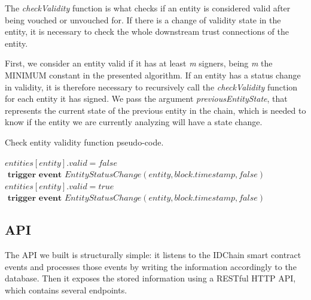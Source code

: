 The \textit{checkValidity} function is what checks if an entity is considered valid after being vouched or unvouched for.
If there is a change of validity state in the entity, it is necessary to check the whole downstream trust connections of the entity.

First, we consider an entity valid if it has at least \textit{m} signers, being \textit{m} the MINIMUM constant in the presented algorithm.
If an entity has a status change in validity, it is therefore necessary to recursively call the \textit{checkValidity} function for each entity it has signed.
We pass the argument \textit{previousEntityState}, that represents the current state of the previous entity in the chain, which is needed to know if the entity we are currently analyzing will have a state change.

\begin{algorithm}[h!]
  \caption{Check entity validity function pseudo-code.}
  \label{alg:check-entity-validity}
  \begin{algorithmic}[1]
      \State $entities[entity].valid = false$
        \State {}
      \EndFor
      \State $\textbf{ trigger event } EntityStatusChange(entity, block.timestamp, false)$
    \EndIf
    \State
      \State $entities[entity].valid = true$
        \State {}
      \EndFor
      \State $\textbf{ trigger event } EntityStatusChange(entity, block.timestamp, false)$
    \EndIf
    \EndFunction
  \end{algorithmic}
\end{algorithm}


\subsection{API}\label{subsection:api}

The API we built is structurally simple: it listens to the IDChain smart contract events and processes those events by writing the information accordingly to the database.
Then it exposes the stored information using a RESTful HTTP API, which contains several endpoints.

